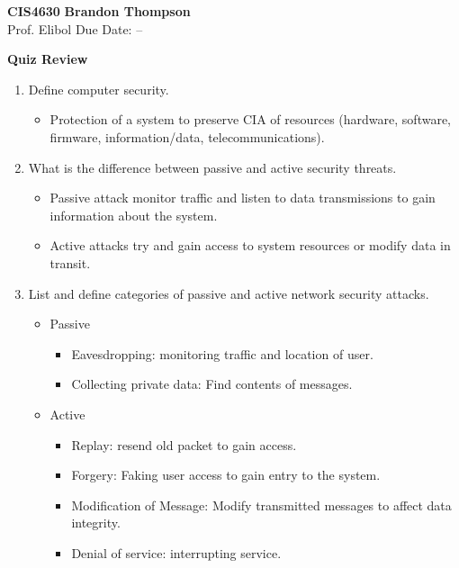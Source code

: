 \documentclass[12pt]{article}
\begin{document}
\noindent
\textbf{CIS4630} \hfill \textbf{Brandon Thompson} \\
\normalsize Prof. Elibol \hfill Due Date: -- \\

\begin{center}
\textbf{Quiz Review}
\end{center}
\begin{enumerate}[label=Q1.\arabic*]
		\item Define computer security.
			\begin{itemize}
				\item Protection of a system to preserve CIA of resources (hardware, software, firmware, information/data, telecommunications).
			\end{itemize}
		\item What is the difference between passive and active security threats.
			\begin{itemize}
				\item Passive attack monitor traffic and listen to data transmissions to gain information about the system.
				\item Active attacks try and gain access to system resources or modify data in transit.
			\end{itemize}
		\item List and define categories of passive and active network security attacks.
			\begin{itemize}
				\item Passive
					\begin{itemize}
						\item Eavesdropping: monitoring traffic and location of user.
						\item Collecting private data: Find contents of messages.
					\end{itemize}
				\item Active
					\begin{itemize}
						\item Replay: resend old packet to gain access.
						\item Forgery: Faking user access to gain entry to the system.
						\item Modification of Message: Modify transmitted messages to affect data integrity.
						\item Denial of service: interrupting service.
					\end{itemize}
			\end{itemize}


\end{enumerate}
\end{document}
